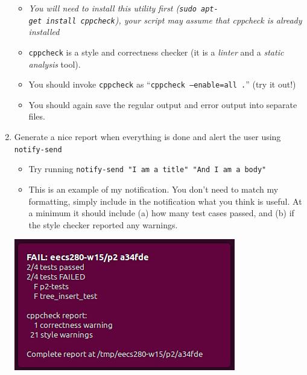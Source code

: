 \documentclass{article}
\begin{document}
\begin{enumerate}
    \begin{itemize}
      \item \emph{\small You will need to install this utility first
        (\texttt{sudo~apt-get~install~cppcheck}), your script may assume that
        cppcheck is already installed}
      \item \texttt{cppcheck} is a style and correctness checker (it is a
        \emph{linter} and a \emph{static analysis} tool).
      \item You should invoke \texttt{cppcheck} as
        ``\texttt{cppcheck~--enable=all~.}'' (try it out!)
      \item You should again save the regular output and error output into
        separate files.
    \end{itemize}
  \item Generate a nice report when everything is done and alert the user
    using \texttt{notify-send}\\
    \begin{minipage}{0.6\textwidth}
      \begin{itemize}
        \item Try running \texttt{notify-send "I am a title" "And I am a body"}
        \item This is an example of my notification. You don't need to match my
          formatting, simply include in the notification what you think is
          useful. At a minimum it should include (a) how many test cases passed,
          and (b) if the style checker reported any warnings.
      \end{itemize}
    \end{minipage}
    \hfill
    \begin{minipage}{0.3\textwidth}
      \includegraphics[width=\linewidth]{notification}
    \end{minipage}
\end{enumerate}
\end{document}
